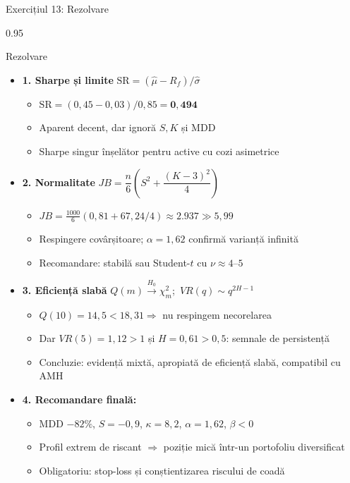 \documentclass[9pt, aspectratio=169, t]{beamer}
\begin{document}
\begin{frame}[shrink=25]{Exercițiul 13: Rezolvare}
\begin{cminipage}{0.95\textwidth}
\begin{exampleblock}{Rezolvare}
\small
\begin{itemize}\setlength{\itemsep}{0pt}
    \item \textbf{1. Sharpe și limite} \quad $\text{SR} = (\hat\mu - R_f)/\hat\sigma$
    \begin{itemize}\setlength{\itemsep}{0pt}
        \item $\text{SR} = (0{,}45 - 0{,}03)/0{,}85 = \mathbf{0{,}494}$
        \item Aparent decent, dar ignoră $S, K$ și MDD
        \item Sharpe singur înșelător pentru active cu cozi asimetrice
    \end{itemize}
    \item \textbf{2. Normalitate} \quad $JB = \dfrac{n}{6}\left(S^2 + \dfrac{(K-3)^2}{4}\right)$
    \begin{itemize}\setlength{\itemsep}{0pt}
        \item $JB = \frac{1000}{6}(0{,}81 + 67{,}24/4) \approx 2.937 \gg 5{,}99$
        \item Respingere covârșitoare; $\alpha = 1{,}62$ confirmă varianță infinită
        \item Recomandare: stabilă sau Student-$t$ cu $\nu \approx 4$--$5$
    \end{itemize}
    \item \textbf{3. Eficiență slabă} \quad $Q(m) \xrightarrow{H_0} \chi^2_m$;\ $VR(q) \sim q^{2H-1}$
    \begin{itemize}\setlength{\itemsep}{0pt}
        \item $Q(10) = 14{,}5 < 18{,}31 \Rightarrow$ nu respingem necorelarea
        \item Dar $VR(5) = 1{,}12 > 1$ și $H = 0{,}61 > 0{,}5$: semnale de persistență
        \item Concluzie: evidență mixtă, apropiată de eficiență slabă, compatibil cu AMH
    \end{itemize}
    \item \textbf{4. Recomandare finală:}
    \begin{itemize}\setlength{\itemsep}{0pt}
        \item MDD $-82\%$, $S = -0{,}9$, $\kappa = 8{,}2$, $\alpha = 1{,}62$, $\beta < 0$
        \item Profil extrem de riscant $\Rightarrow$ poziție mică într-un portofoliu diversificat
        \item Obligatoriu: stop-loss și conștientizarea riscului de coadă
    \end{itemize}
\end{itemize}
\end{exampleblock}
\end{cminipage}
\end{frame}
\end{document}
